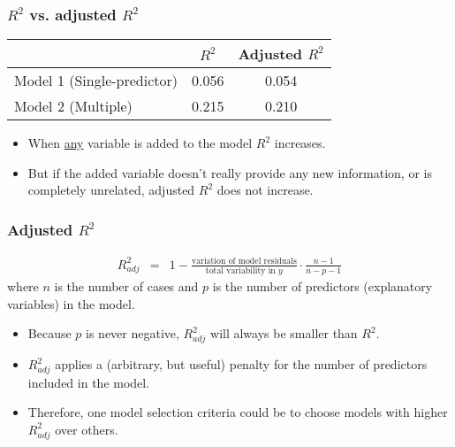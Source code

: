 \documentclass[table]{beamer}\usepackage[]{graphicx}\usepackage[]{color}
\begin{document}
\begin{frame}[fragile]
\frametitle{$R^2$ vs. adjusted $R^2$}

\renewcommand\arraystretch{1.25}
\begin{center}
\begin{tabular}{l | c  c}
			& $R^2$	& Adjusted $R^2$ \\
\hline
Model 1 (Single-predictor)	& 0.056	& 0.054 \\
Model 2 (Multiple)			& 0.215	& 0.210
\end{tabular}
\end{center}


\begin{itemize}

\item When \underline{any} variable is added to the model $R^2$ increases.

\item But if the added variable doesn't really provide any new information, or is completely unrelated, adjusted $R^2$ does not increase.

\end{itemize}



\end{frame}


\begin{frame}[fragile]
\frametitle{Adjusted $R^2$}


\begin{eqnarray*}
 R^2_{adj} & = & 1-\frac{\text{variation of model residuals}}{\text{total variability in }y} \cdot \frac{n - 1}{n - p - 1}
\end{eqnarray*}
where $n$ is the number of cases and $p$ is the number of predictors (explanatory variables) in the model.

\begin{itemize}

\item Because $p$ is never negative, $R^2_{adj}$ will always be smaller than $R^2$.
\item $R^2_{adj}$ applies a (arbitrary, but useful) penalty for the number of predictors included in the model.
\item Therefore, one model selection criteria could be to choose models with higher $R^2_{adj}$ over others.

\end{itemize}

\end{frame}
\end{document}
